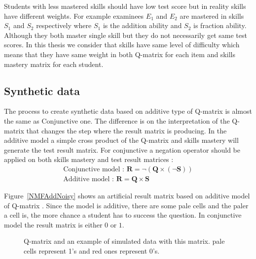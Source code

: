 
Students with less mastered skills should have low test score but in reality skills have different weights. For example examinees $E_1$ and $E_2$ are mastered in skills $S_1$ and $S_2$ respectively where $S_1$ is the addition ability and $S_2$ is fraction ability. Although they both master single skill but they do not necessarily get same test scores. In this thesis we consider that skills have same level of difficulty which means that they have same weight in both Q-matrix for each item and skills mastery matrix for each student. 



\subsection{Synthetic data}

The process to create synthetic data based on additive type of Q-matrix is almost the same as Conjunctive one. The difference is on the interpretation of the Q-matrix that changes the step where the result matrix is producing. In the additive model a simple cross product of the Q-matrix and skills mastery will generate the test result matrix. For conjunctive a negation operator should be applied on both skills mastery and test result matrices : 
\begin{equation}
\begin{array}{c}
\text{Conjunctive model :   } \mathbf{R}=\neg\left(\mathbf{Q}\times\left(\neg\mathbf{S}\right)\right)\\
\text{Additive model :   } \mathbf{R}=\mathbf{Q}\times\mathbf{S}
\end{array}
\label{NMF_GEN_EQ}
\end{equation}

Figure~\ref{NMFAddNoisy} shows an artificial result matrix based on additive model of Q-matrix . Since the model is additive, there are some pale cells and the paler a cell is, the more chance a student has to success the question. In conjunctive model the result matrix is either $0$ or $1$. 


\begin{figure}[ht]
\centering

\quad
\caption{Q-matrix and an example of simulated data with this matrix.  pale cells represent 1's and red ones represent 0's.}
\label{figqmatrixandResutM}
\end{figure}



